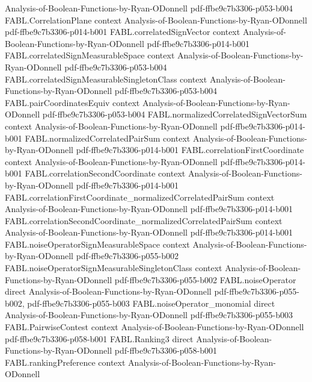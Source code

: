 \begin{theorem}
  {Analysis-of-Boolean-Functions-by-Ryan-ODonnell}
  {pdf-ffbe9c7b3306-p053-b004}
\proofstep
  {FABL.CorrelationPlane}
  {context}
  {Analysis-of-Boolean-Functions-by-Ryan-ODonnell}
  {pdf-ffbe9c7b3306-p014-b001}
\proofstep
  {FABL.correlatedSignVector}
  {context}
  {Analysis-of-Boolean-Functions-by-Ryan-ODonnell}
  {pdf-ffbe9c7b3306-p014-b001}
\proofstep
  {FABL.correlatedSignMeasurableSpace}
  {context}
  {Analysis-of-Boolean-Functions-by-Ryan-ODonnell}
  {pdf-ffbe9c7b3306-p053-b004}
\proofstep
  {FABL.correlatedSignMeasurableSingletonClass}
  {context}
  {Analysis-of-Boolean-Functions-by-Ryan-ODonnell}
  {pdf-ffbe9c7b3306-p053-b004}
\proofstep
  {FABL.pairCoordinatesEquiv}
  {context}
  {Analysis-of-Boolean-Functions-by-Ryan-ODonnell}
  {pdf-ffbe9c7b3306-p053-b004}
\proofstep
  {FABL.normalizedCorrelatedSignVectorSum}
  {context}
  {Analysis-of-Boolean-Functions-by-Ryan-ODonnell}
  {pdf-ffbe9c7b3306-p014-b001}
\proofstep
  {FABL.normalizedCorrelatedPairSum}
  {context}
  {Analysis-of-Boolean-Functions-by-Ryan-ODonnell}
  {pdf-ffbe9c7b3306-p014-b001}
\proofstep
  {FABL.correlationFirstCoordinate}
  {context}
  {Analysis-of-Boolean-Functions-by-Ryan-ODonnell}
  {pdf-ffbe9c7b3306-p014-b001}
\proofstep
  {FABL.correlationSecondCoordinate}
  {context}
  {Analysis-of-Boolean-Functions-by-Ryan-ODonnell}
  {pdf-ffbe9c7b3306-p014-b001}
\proofstep
  {FABL.correlationFirstCoordinate_normalizedCorrelatedPairSum}
  {context}
  {Analysis-of-Boolean-Functions-by-Ryan-ODonnell}
  {pdf-ffbe9c7b3306-p014-b001}
\proofstep
  {FABL.correlationSecondCoordinate_normalizedCorrelatedPairSum}
  {context}
  {Analysis-of-Boolean-Functions-by-Ryan-ODonnell}
  {pdf-ffbe9c7b3306-p014-b001}
\proofstep
  {FABL.noiseOperatorSignMeasurableSpace}
  {context}
  {Analysis-of-Boolean-Functions-by-Ryan-ODonnell}
  {pdf-ffbe9c7b3306-p055-b002}
\proofstep
  {FABL.noiseOperatorSignMeasurableSingletonClass}
  {context}
  {Analysis-of-Boolean-Functions-by-Ryan-ODonnell}
  {pdf-ffbe9c7b3306-p055-b002}
\proofstep
  {FABL.noiseOperator}
  {direct}
  {Analysis-of-Boolean-Functions-by-Ryan-ODonnell}
  {pdf-ffbe9c7b3306-p055-b002,
    pdf-ffbe9c7b3306-p055-b003}
\proofstep
  {FABL.noiseOperator_monomial}
  {direct}
  {Analysis-of-Boolean-Functions-by-Ryan-ODonnell}
  {pdf-ffbe9c7b3306-p055-b003}
\proofstep
  {FABL.PairwiseContest}
  {context}
  {Analysis-of-Boolean-Functions-by-Ryan-ODonnell}
  {pdf-ffbe9c7b3306-p058-b001}
\proofstep
  {FABL.Ranking3}
  {direct}
  {Analysis-of-Boolean-Functions-by-Ryan-ODonnell}
  {pdf-ffbe9c7b3306-p058-b001}
\proofstep
  {FABL.rankingPreference}
  {context}
  {Analysis-of-Boolean-Functions-by-Ryan-ODonnell}

\end{theorem}
